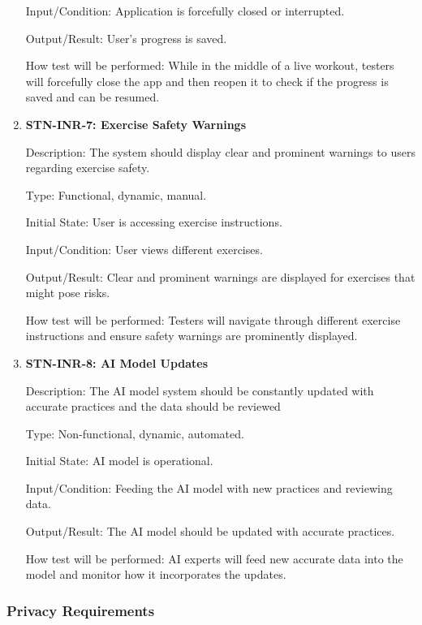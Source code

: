 \documentclass[12pt, titlepage]{article}
\begin{document}
\begin{enumerate}
        Input/Condition: Application is forcefully closed or interrupted.

        Output/Result: User's progress is saved.

        How test will be performed: While in the middle of a live workout, testers will forcefully close the app and then reopen it to check if the progress is saved and can be resumed.


        \item{\textbf{STN-INR-7: Exercise Safety Warnings}}

        Description: The system should display clear and prominent warnings to users regarding exercise safety.

        Type: Functional, dynamic, manual.

        Initial State: User is accessing exercise instructions.

        Input/Condition: User views different exercises.

        Output/Result: Clear and prominent warnings are displayed for exercises that might pose risks.

        How test will be performed: Testers will navigate through different exercise instructions and ensure safety warnings are prominently displayed.


        \item{\textbf{STN-INR-8: AI Model Updates}}

        Description: The AI model system should be constantly updated with accurate practices and the data should be reviewed

        Type: Non-functional, dynamic, automated.

        Initial State: AI model is operational.

        Input/Condition: Feeding the AI model with new practices and reviewing data.

        Output/Result: The AI model should be updated with accurate practices.

        How test will be performed: AI experts will feed new accurate data into the model and monitor how it incorporates the updates.

    \end{enumerate}


    \subsubsection{Privacy Requirements}
\end{document}
